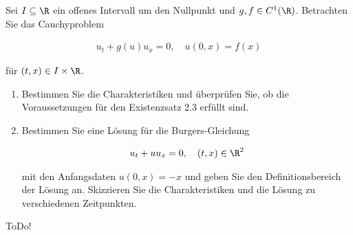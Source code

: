 
\begin{exercise}

Sei $I \subseteq \R$ ein offenes Intervall um den Nullpunkt und $g, f \in C^1(\R)$.
Betrachten Sie das Cauchyproblem

\begin{align*}
    u_t + g(u) u_x = 0,
    \quad
    u(0, x) = f(x)
\end{align*}

für $(t, x) \in I \times \R$.

\begin{enumerate}[label = (\roman*)]

    \item Bestimmen Sie die Charakteristiken und überprüfen Sie, ob die Voraussetzungen für den Existenzsatz 2.3 erfüllt sind.

    \item Bestimmen Sie eine Lösung für die Burgers-Gleichung
    
    \begin{align*}
        u_t + u u_x = 0,
        \quad
        (t, x) \in \R^2
    \end{align*}

    mit den Anfangsdaten $u(0, x) = -x$ und geben Sie den Definitionsbereich der Lösung an.
    Skizzieren Sie die Charakteristiken und die Lösung zu verschiedenen Zeitpunkten.

\end{enumerate}

\end{exercise}


\begin{solution}

ToDo!

\end{solution}

